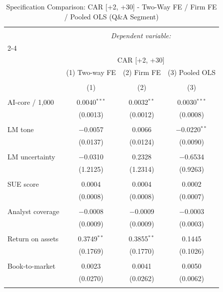 
\begin{table}[!htbp] \centering 
  \caption{Specification Comparison: CAR [+2, +30] - Two-Way FE / Firm FE / Pooled OLS (Q\&A Segment)} 
  \label{} 
\begin{tabular}{@{\extracolsep{5pt}}lccc} 
\\[-1.8ex]\hline 
\hline \\[-1.8ex] 
 & \multicolumn{3}{c}{\textit{Dependent variable:}} \\ 
\cline{2-4} 
\\[-1.8ex] & \multicolumn{3}{c}{CAR [+2, +30]} \\ 
 & (1) Two-way FE & (2) Firm FE & (3) Pooled OLS \\ 
\\[-1.8ex] & (1) & (2) & (3)\\ 
\hline \\[-1.8ex] 
 AI-core / 1,000 & 0.0040$^{***}$ & 0.0032$^{**}$ & 0.0030$^{***}$ \\ 
  & (0.0013) & (0.0012) & (0.0008) \\ 
  & & & \\ 
 LM tone & $-$0.0057 & 0.0066 & $-$0.0220$^{**}$ \\ 
  & (0.0137) & (0.0124) & (0.0090) \\ 
  & & & \\ 
 LM uncertainty & $-$0.0310 & 0.2328 & $-$0.6534 \\ 
  & (1.2125) & (1.2314) & (0.9263) \\ 
  & & & \\ 
 SUE score & 0.0004 & 0.0004 & 0.0002 \\ 
  & (0.0008) & (0.0008) & (0.0007) \\ 
  & & & \\ 
 Analyst coverage & $-$0.0008 & $-$0.0009 & $-$0.0003 \\ 
  & (0.0009) & (0.0009) & (0.0003) \\ 
  & & & \\ 
 Return on assets & 0.3749$^{**}$ & 0.3855$^{**}$ & 0.1445 \\ 
  & (0.1769) & (0.1770) & (0.1026) \\ 
  & & & \\ 
 Book-to-market & 0.0023 & 0.0041 & 0.0050 \\ 
  & (0.0270) & (0.0262) & (0.0062) \\ 
  & & & \\ 

\end{tabular}
\end{table}
